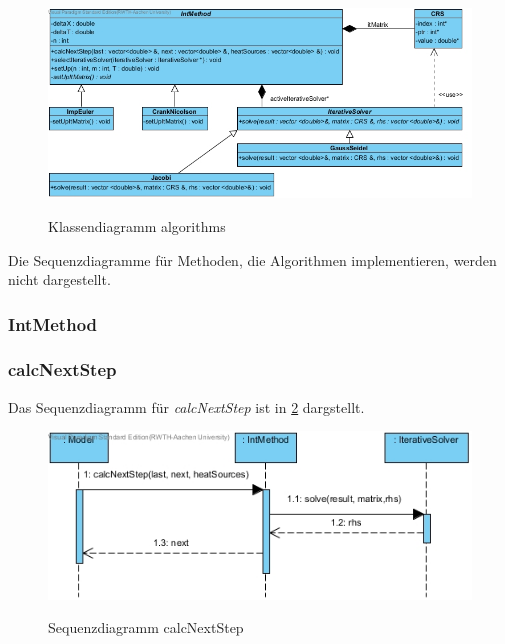 \begin{figure}[H]
	\centering
	\includegraphics[scale=.65]{Bilder/algorithms.jpg}\\
	\caption{Klassendiagramm algorithms}
	\label{Klassendiagramm algorithms}
\end{figure}

Die Sequenzdiagramme für Methoden, die Algorithmen implementieren, werden nicht dargestellt.

\subsubsection{IntMethod}

\subsubsection*{calcNextStep}

Das Sequenzdiagramm für \emph{calcNextStep} ist in \ref{Sequenzdiagramm calcNextStep} dargstellt.

\begin{figure}[H]
	\centering
	\includegraphics[scale=.6]{Bilder/IntMethod__calcNextStep().jpg}\\
	\caption{Sequenzdiagramm calcNextStep}
	\label{Sequenzdiagramm calcNextStep}
\end{figure}


